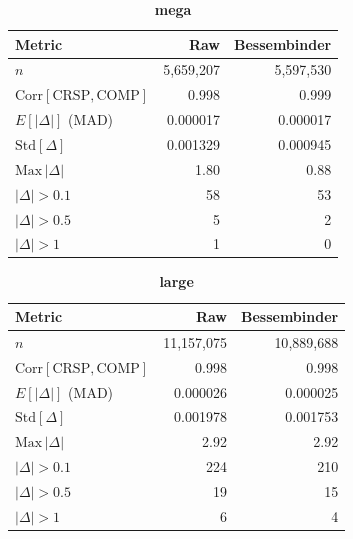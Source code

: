 \documentclass[11pt]{article}
\newcommand{\cmphead}{%
  \toprule
  Metric & Raw & Bessembinder \\
  \midrule
}
\begin{document}
\begin{table}[h]
\centering
\caption*{\textbf{mega}}
\begin{tabular}{lrr}
\cmphead
$n$                                          & 5{,}659{,}207 & 5{,}597{,}530 \\
$\mathrm{Corr}[\mathrm{CRSP}, \mathrm{COMP}]$& 0.998 & 0.999 \\
$E[|\Delta|]$ (MAD)                          & 0.000017 & 0.000017 \\
$\mathrm{Std}[\Delta]$                       & 0.001329 & 0.000945 \\
$\mathrm{Max}\,|\Delta|$                     & 1.80 & 0.88 \\
$|\Delta|>0.1$                               & 58 & 53 \\
$|\Delta|>0.5$                               & 5 & 2 \\
$|\Delta|>1$                                 & 1 & 0 \\
\bottomrule
\end{tabular}
\end{table}

\begin{table}[h]
\centering
\caption*{\textbf{large}}
\begin{tabular}{lrr}
\cmphead
$n$                                          & 11{,}157{,}075 & 10{,}889{,}688 \\
$\mathrm{Corr}[\mathrm{CRSP}, \mathrm{COMP}]$& 0.998 & 0.998 \\
$E[|\Delta|]$ (MAD)                          & 0.000026 & 0.000025 \\
$\mathrm{Std}[\Delta]$                       & 0.001978 & 0.001753 \\
$\mathrm{Max}\,|\Delta|$                     & 2.92 & 2.92 \\
$|\Delta|>0.1$                               & 224 & 210 \\
$|\Delta|>0.5$                               & 19 & 15 \\
$|\Delta|>1$                                 & 6 & 4 \\
\bottomrule
\end{tabular}
\end{table}
\end{document}
